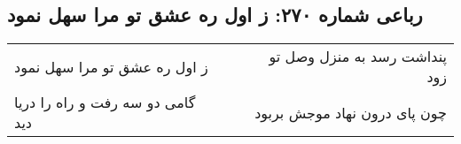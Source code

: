 \begin{center}
\section*{رباعی شماره ۲۷۰: ز اول ره عشق تو مرا سهل نمود}
\label{sec:sh270}
\begin{longtable}{l p{0.5cm} r}
ز اول ره عشق تو مرا سهل نمود
&&
پنداشت رسد به منزل وصل تو زود
\\
گامی دو سه رفت و راه را دریا دید
&&
چون پای درون نهاد موجش بربود
\\
\end{longtable}
\end{center}
